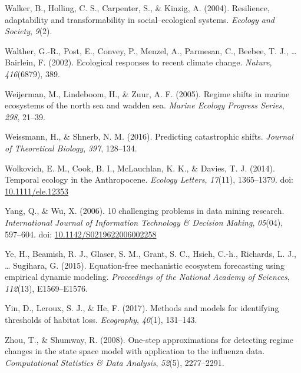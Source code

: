 \documentclass[12pt,twoside,openany]{reedthesis}
\begin{document}
\leavevmode\hypertarget{ref-walker2004resilience}{}%
Walker, B., Holling, C. S., Carpenter, S., \& Kinzig, A. (2004). Resilience, adaptability and transformability in social--ecological systems. \emph{Ecology and Society}, \emph{9}(2).

\leavevmode\hypertarget{ref-walther_ecological_2002}{}%
Walther, G.-R., Post, E., Convey, P., Menzel, A., Parmesan, C., Beebee, T. J., \ldots{} Bairlein, F. (2002). Ecological responses to recent climate change. \emph{Nature}, \emph{416}(6879), 389.

\leavevmode\hypertarget{ref-weijerman2005regime}{}%
Weijerman, M., Lindeboom, H., \& Zuur, A. F. (2005). Regime shifts in marine ecosystems of the north sea and wadden sea. \emph{Marine Ecology Progress Series}, \emph{298}, 21--39.

\leavevmode\hypertarget{ref-weissmann2016predicting}{}%
Weissmann, H., \& Shnerb, N. M. (2016). Predicting catastrophic shifts. \emph{Journal of Theoretical Biology}, \emph{397}, 128--134.

\leavevmode\hypertarget{ref-wolkovich_temporal_2014}{}%
Wolkovich, E. M., Cook, B. I., McLauchlan, K. K., \& Davies, T. J. (2014). Temporal ecology in the Anthropocene. \emph{Ecology Letters}, \emph{17}(11), 1365--1379. doi: \href{https://doi.org/10.1111/ele.12353}{10.1111/ele.12353}

\leavevmode\hypertarget{ref-yang_10_2006}{}%
Yang, Q., \& Wu, X. (2006). 10 challenging problems in data mining research. \emph{International Journal of Information Technology \& Decision Making}, \emph{05}(04), 597--604. doi: \href{https://doi.org/10.1142/S0219622006002258}{10.1142/S0219622006002258}

\leavevmode\hypertarget{ref-ye2015equation}{}%
Ye, H., Beamish, R. J., Glaser, S. M., Grant, S. C., Hsieh, C.-h., Richards, L. J., \ldots{} Sugihara, G. (2015). Equation-free mechanistic ecosystem forecasting using empirical dynamic modeling. \emph{Proceedings of the National Academy of Sciences}, \emph{112}(13), E1569--E1576.

\leavevmode\hypertarget{ref-yin2017methods}{}%
Yin, D., Leroux, S. J., \& He, F. (2017). Methods and models for identifying thresholds of habitat loss. \emph{Ecography}, \emph{40}(1), 131--143.

\leavevmode\hypertarget{ref-zhou2008one}{}%
Zhou, T., \& Shumway, R. (2008). One-step approximations for detecting regime changes in the state space model with application to the influenza data. \emph{Computational Statistics \& Data Analysis}, \emph{52}(5), 2277--2291.
\end{document}
